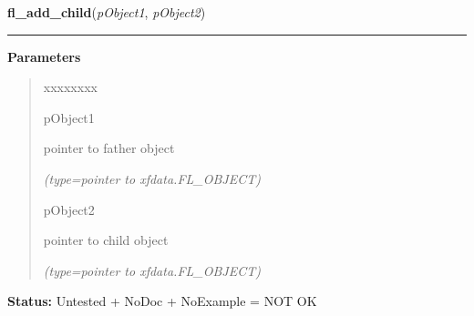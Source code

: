     \label{xformslib:library:fl_add_child}

    \vspace{0.5ex}

\hspace{.8\funcindent}\begin{boxedminipage}{\funcwidth}

    \raggedright \textbf{fl\_add\_child}(\textit{pObject1}, \textit{pObject2})

    \vspace{-1.5ex}

    \rule{\textwidth}{0.5\fboxrule}
\setlength{\parskip}{2ex}
\setlength{\parskip}{1ex}
      \textbf{Parameters}
      \vspace{-1ex}

      \begin{quote}
        \begin{Ventry}{xxxxxxxx}

          \item[pObject1]

          pointer to father object

            {\it (type=pointer to xfdata.FL\_OBJECT)}

          \item[pObject2]

          pointer to child object

            {\it (type=pointer to xfdata.FL\_OBJECT)}

        \end{Ventry}

      \end{quote}

\textbf{Status:} Untested + NoDoc + NoExample = NOT OK



    \end{boxedminipage}

    \label{xformslib:library:fl_set_coordunit}

    \vspace{0.5ex}

